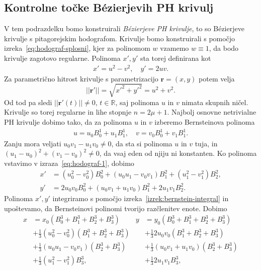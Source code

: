 \documentclass[isrm2, tisk]{fmfdelo}
\newcommand{\R}{\mathbb R}
\begin{document}
    \subsection{Kontrolne točke Bézierjevih PH krivulj}
    V tem podrazdelku bomo konstruirali \textit{Bézierjeve PH krivulje}, to so Bézierjeve krivulje s pitagorejskim hodografom.
    Krivulje bomo konstruirali s pomočjo izreka~\eqref{eq:hodograf-splosni}, kjer za polinomom $w$ vzamemo $w\equiv 1$, da bodo krivulje zagotovo regularne.
    Polinoma $x',y'$ sta torej definirana kot
    \begin{align}
        x'=u^2-v^2,\quad y'=2uv.  \label{eq:hodograf-1}
    \end{align}
    Za parametrično hitrost krivulje s parametrizacijo $\mathbf{r}=(x,y)$ potem velja
    \[||\mathbf{r}'|| =\sqrt{ x'^2 + y'^2} = u^2+v^2.\]
    Od tod pa sledi $||\mathbf{r}'(t)||\neq 0$, $t\in \R$, saj polinoma $u$ in $v$ nimata skupnih ničel.
    Krivulje so torej regularne in lihe stopnje $n=2\mu+1$.
    Najbolj osnovne netrivialne PH krivulje dobimo tako, da za polinoma $u$ in $v$ izberemo Bernsteinova polinoma
    \begin{align}
        \label{eq:ph-bernstein-1}
        u=u_0B_{0}^{1}+u_1B_{1}^{1}, \quad v=v_0B^{1}_{0}+v_1B_{1}^{1}.
    \end{align}
    Zanju mora veljati $u_0v_1-u_1v_0\neq 0$, da sta si polinoma $u$ in $v$ tuja, in $(u_1-u_0)^2+(v_1-v_0)^2\neq 0$, da vsaj eden od njiju ni konstanten.
    Ko polinoma vstavimo v izraza~\eqref{eq:hodograf-1}, dobimo
    \begin{align*}
        x' &=(u_0^2-v_0^2)B_{0}^{2}+(u_0u_1-v_0v_1)B_{1}^{2} + (u_1^2-v_1^2)B_{2}^{2},\\
        y' &= 2u_0 v_0 B_{0}^{2}+(u_0v_1+u_1v_0)B_{1}^{2}+2u_1 v_1 B_{2}^{2}.
    \end{align*}
    Polinoma $x',y'$ integriramo s pomočjo izreka~\ref{izrek:bernstein-integral} in upoštevamo, da Bernsteinovi polinomi tvorijo razčlenitev enote.
    Dobimo
    \begin{align*}
        x &= x_0(B_{0}^{3} + B_{1}^{3} + B_{2}^{3}+ B_{3}^{3}) & y &= y_0(B_{0}^{3} + B_{1}^{3} + B_{2}^{3}+ B_{3}^{3}) \\
        &+ \frac{1}{3}(u_0^2-v_0^2)(B_{1}^{3} + B_{2}^{3}+ B_{3}^{3})    &     &+ \frac{1}{3}2u_0 v_0(B_{1}^{3} + B_{2}^{3}+ B_{3}^{3}) \\
        &+ \frac{1}{3}(u_0u_1-v_0v_1)(B_{2}^{3}+ B_{3}^{3})          &     &+ \frac{1}{3}(u_0v_1+u_1v_0)(B_{2}^{3}+ B_{3}^{3})\\
        &+ \frac{1}{3} (u_1^2-v_1^2)B_{3}^{3},                        &     &+ \frac{1}{3} 2u_1 v_1 B_{3}^{3},
    \end{align*}
\end{document}
